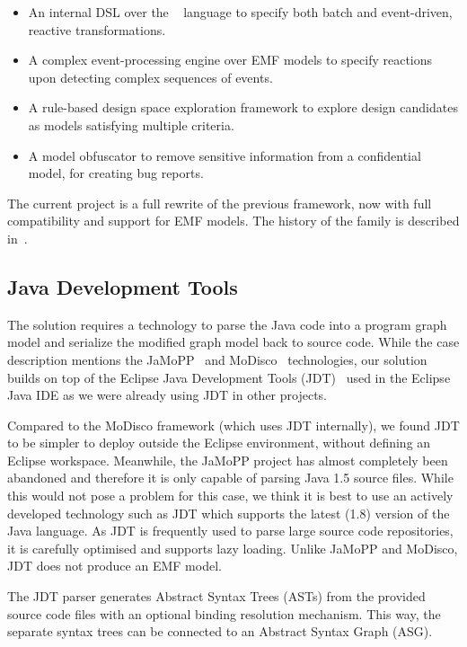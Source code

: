 \documentclass[submission,copyright,creativecommons]{eptcs}
\begin{document}
\begin{itemize}[noitemsep]
	\item An internal DSL over the \xtend~\cite{Xtend} language to specify both batch and event-driven, reactive transformations.
	\item A complex event-processing engine over EMF models to specify reactions upon detecting complex sequences of events.
	\item A rule-based design space exploration framework to explore design candidates as models satisfying multiple criteria.
	\item A model obfuscator to remove sensitive information from a confidential model, \eg for creating bug reports.
\end{itemize}

The current \viatra{} project is a full rewrite of the previous \viatratwo{} framework, now with full compatibility and support for EMF models. The history of the \viatra{} family is described in~\cite{viatra-history}.

\subsection{Java Development Tools}

The solution requires a technology to parse the Java code into a program graph model and serialize the modified graph model back to source code. While the case description mentions the JaMoPP~\cite{JaMoPP} and MoDisco~\cite{MoDisco} technologies, our solution builds on top of the Eclipse Java Development Tools (JDT)~\cite{jdt} used in the Eclipse Java IDE as we were already using JDT in other projects.

Compared to the MoDisco framework (which uses JDT internally), we found JDT to be simpler to deploy outside the Eclipse environment, \ie without defining an Eclipse workspace. Meanwhile, the JaMoPP project has almost completely been abandoned and therefore it is only capable of parsing Java 1.5 source files. While this would not pose a problem for this case, we think it is best to use an actively developed technology such as JDT which supports the latest (1.8) version of the Java language. As JDT is frequently used to parse large source code repositories, it is carefully optimised and supports lazy loading. Unlike JaMoPP and MoDisco, JDT does not produce an EMF model.

The JDT parser generates Abstract Syntax Trees (ASTs) from the provided source code files with an optional binding resolution mechanism. This way, the separate syntax trees can be connected to an Abstract Syntax Graph (ASG).
\end{document}
